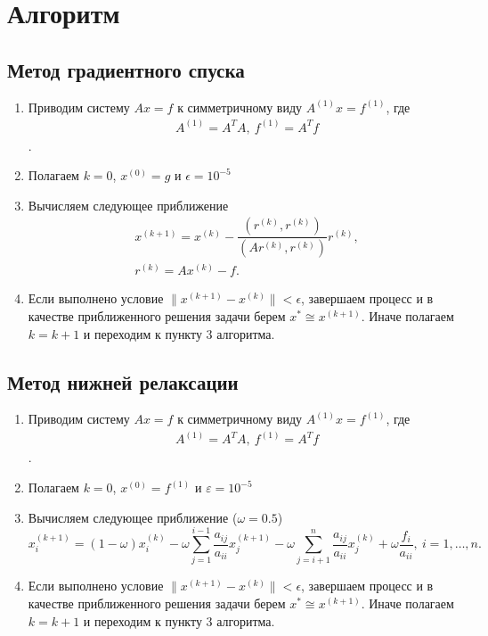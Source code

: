 \documentclass[11.4pt]{article}
\begin{document}
\section{Алгоритм}
	\subsection{Метод градиентного спуска}
	\begin{enumerate}
		\item Приводим систему $Ax=f$ к симметричному виду $A^{(1)}x = f^{(1)}$, где \begin{align*}
			&A^{(1)} = A^TA, \: f^{(1)}=A^Tf
		\end{align*}.
		\item Полагаем $k=0$, $x^{(0)}=g$ и $\epsilon = 10^{-5}$
		\item Вычисляем следующее приближение 
		\begin{equation*}
			\begin{aligned}
				&x^{(k+1)} = x^{(k)} - \dfrac{(r^{(k)}, r^{(k)})}{(Ar^{(k)}, r^{(k)})}r^{(k)},\\
				&r^{(k)} = Ax^{(k)} - f.
			\end{aligned}
		\end{equation*}
		\item Если выполнено условие $\|x^{(k+1)}-x^{(k)}\|<\epsilon$, завершаем процесс  и в качестве приближенного решения задачи берем $x^{\ast} \cong x^{(k+1)}$. Иначе полагаем $k=k+1$ и переходим к пункту 3 алгоритма.
	\end{enumerate}
	\subsection{Метод нижней релаксации}
	\begin{enumerate}
		\item Приводим систему $Ax=f$ к симметричному виду $A^{(1)}x = f^{(1)}$, где \begin{align*}
			&A^{(1)} = A^TA, \: f^{(1)}=A^Tf
		\end{align*}.
		\item Полагаем $k=0$, $x^{(0)}=f^{(1)}$ и $\varepsilon = 10^{-5}$
		\item Вычисляем следующее приближение ($\omega=0.5$)
		\[x^{(k+1)}_i = (1-\omega)x^{(k)}_i-\omega\sum\limits_{j=1}^{i-1} \frac{a_{ij}} {a_{ii}}x^{(k+1)}_j -\omega\sum\limits_{j=i+1}^n\dfrac{a_{ij}}{a_{ii}}x^{(k)}_j+\omega\dfrac{f_i}{a_{ii}}, \: i=1,\ldots,n. \]
		\item Если выполнено условие $\|x^{(k+1)}-x^{(k)}\|<\epsilon$, завершаем процесс  и в качестве приближенного решения задачи берем $x^{\ast} \cong x^{(k+1)}$. Иначе полагаем $k=k+1$ и переходим к пункту 3 алгоритма.
	\end{enumerate}
\end{document}
